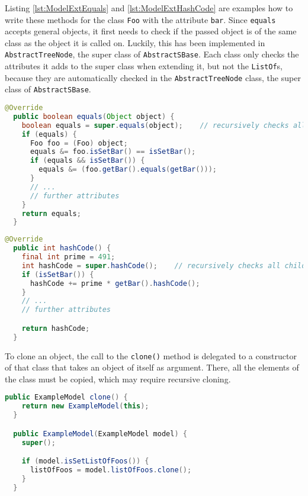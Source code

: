 Listing \ref{lst:ModelExtEquals} and \ref{lst:ModelExtHashCode} are examples how to write these methods for the class \texttt{Foo} with the attribute \texttt{bar}.
Since \texttt{equals} accepts general objects, it first needs to check if the passed object is of the same class as the object it is called on.
Luckily, this has been implemented in \texttt{AbstractTreeNode}, the super class of \texttt{AbstractSBase}.
Each class only checks the attributes it adds to the super class when extending it, but not the \texttt{ListOf}s,
because they are automatically checked in the \texttt{AbstractTreeNode} class, the super class of \texttt{AbstractSBase}.

\begin{lstlisting}[language=Java,caption={Example of the \texttt{equals} method},label={lst:ModelExtEquals}]
@Override
  public boolean equals(Object object) {
    boolean equals = super.equals(object);    // recursively checks all children
    if (equals) {
      Foo foo = (Foo) object;
      equals &= foo.isSetBar() == isSetBar();
      if (equals && isSetBar()) {
        equals &= (foo.getBar().equals(getBar()));
      }
      // ...
      // further attributes
    }
    return equals;
  }
\end{lstlisting}


\begin{lstlisting}[language=Java,caption={Example of the \texttt{hashCode} method. The variable \texttt{prime} should be a big prime number to prevent collisions},label={lst:ModelExtHashCode}]
  @Override
  public int hashCode() {
    final int prime = 491;
    int hashCode = super.hashCode();    // recursively checks all children
    if (isSetBar()) {
      hashCode += prime * getBar().hashCode();
    }
    // ...
    // further attributes

    return hashCode;
  }
\end{lstlisting}

To clone an object, the call to the \texttt{clone()} method is delegated to a constructor of that class that takes an object of itself as argument.
There, all the elements of the class must be copied, which may require recursive cloning.

\begin{lstlisting}[language=Java,caption={Example of the \texttt{clone} method for the \texttt{ExampleModel} class},label={lst:ModelExtClone}]
  public ExampleModel clone() {
    return new ExampleModel(this);
  }

  public ExampleModel(ExampleModel model) {
    super();

    if (model.isSetListOfFoos()) {
      listOfFoos = model.listOfFoos.clone();
    }
  }
\end{lstlisting}


